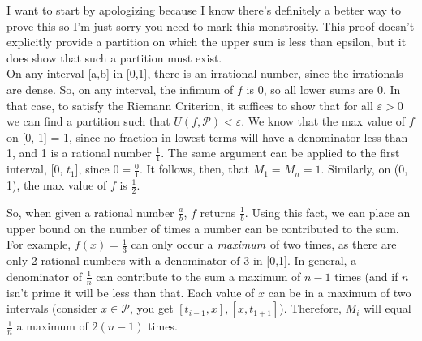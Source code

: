 \documentclass{article}
\begin{document}
I want to start by apologizing because I know there's definitely a better way to prove this so I'm just sorry you need to mark this monstrosity. 
This proof doesn't explicitly provide a partition on which the upper sum is less than epsilon, but it does show that such a partition must exist.\\
On any interval [a,b] in [0,1], there is an irrational number, since the irrationals are dense. So, on any interval, the infimum of $f$ is 0, so all lower sums are 0. In that case, to satisfy the Riemann Criterion, it suffices to show that for all $\varepsilon > 0$ we can find a partition such that $U(f, \mathcal{P}) < \varepsilon$. We know that the max value of $f$ on [0, 1] = 1, since no fraction in lowest terms will have a denominator less than 1, and 1 is a rational number $\frac{1}{1}$. The same argument can be applied to the first interval, [0, $t_1$], since $0 = \frac{0}{1}$. It follows, then, that $M_{1} = M_{n} = 1$. Similarly, on (0, 1), the max value of $f$ is $\frac{1}{2}$. 

So, when given a rational number $\frac{a}{b}$, $f$ returns $\frac{1}{b}$. Using this fact, we can place an upper bound on the number of times a number can be contributed to the sum. For example, $f(x) = \frac{1}{3}$ can only occur a $\emph{maximum}$ of two times, as there are only 2 rational numbers with a denominator of 3 in [0,1]. In general, a denominator of $\frac{1}{n}$ can contribute to the sum a maximum of $n-1$ times (and if $n$ isn't prime it will be less than that. Each value of $x$ can be in a maximum of two intervals (consider $x \in \mathcal{P}$, you get $[t_{i-1}, x], [x, t_{1+1}]$). Therefore, $M_i$ will equal $\frac{1}{n}$ a maximum of $2(n-1)$ times.
\end{document}
